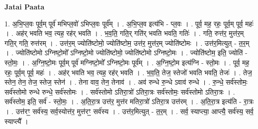 \documentclass[17pt]{extarticle}
\begin{document}
\textbf{Jatai Paata} \newline

1. अ॒भि॒प्ल॒वः पूर्व॒म् पूर्व॑ मभिप्ल॒वो॑ ऽभिप्ल॒वः पूर्व᳚म् । . अ॒भि॒प्ल॒व इत्य॑भि - प्ल॒वः । . पूर्व॒ मह॒ रहः॒ पूर्व॒म् पूर्व॒ महः॑ । . अह॑र् भवति भव॒ त्यह॒ रह॑र् भवति । . भ॒व॒ति॒ गति॒र् गति॑र् भवति भवति॒ गतिः॑ । . गति॒ रुत्त॑र॒ मुत्त॑र॒म् गति॒र् गति॒ रुत्त॑रम् । . उत्त॑र॒म् ज्योति॑ष्टोमो॒ ज्योति॑ष्टोम॒ उत्त॑र॒ मुत्त॑र॒म् ज्योति॑ष्टोमः । . उत्त॑र॒मित्युत् - त॒र॒म् । . ज्योति॑ष्टोमो ऽग्निष्टो॒मो᳚ ऽग्निष्टो॒मो ज्योति॑ष्टोमो॒ ज्योति॑ष्टोमो ऽग्निष्टो॒मः । . ज्योति॑ष्टोम॒ इति॒ ज्योति॑ - स्तो॒मः॒ । . अ॒ग्नि॒ष्टो॒मः पूर्व॒म् पूर्व॑ मग्निष्टो॒मो᳚ ऽग्निष्टो॒मः पूर्व᳚म् । . अ॒ग्नि॒ष्टो॒म इत्य॑ग्नि - स्तो॒मः । . पूर्व॒ मह॒ रहः॒ पूर्व॒म् पूर्व॒ महः॑ । . अह॑र् भवति भव॒ त्यह॒ रह॑र् भवति । . भ॒व॒ति॒ तेज॒ स्तेजो॑ भवति भवति॒ तेजः॑ । . तेज॒ स्तेन॒ तेन॒ तेज॒ स्तेज॒ स्तेन॑ । . तेना वाव॒ तेन॒ तेनाव॑ । . अव॑ रुन्धे रु॒न्धे ऽवाव॑ रुन्धे । . रु॒न्धे॒ सर्व॑स्तोमः॒ सर्व॑स्तोमो रुन्धे रुन्धे॒ सर्व॑स्तोमः । . सर्व॑स्तोमो ऽतिरा॒त्रो॑ ऽतिरा॒त्रः सर्व॑स्तोमः॒ सर्व॑स्तोमो ऽतिरा॒त्रः । . सर्व॑स्तोम॒ इति॒ सर्व॑ - स्तो॒मः॒ । . अ॒ति॒रा॒त्र उत्त॑र॒ मुत्त॑र मतिरा॒त्रो॑ ऽतिरा॒त्र उत्त॑रम् । . अ॒ति॒रा॒त्र इत्य॑ति - रा॒त्रः । . उत्त॑रꣳ॒॒ सर्व॑स्य॒ सर्व॒स्योत्त॑र॒ मुत्त॑रꣳ॒॒ सर्व॑स्य । . उत्त॑र॒मित्युत् - त॒र॒म् । . सर्व॒ स्याप्त्या॒ आप्त्यै॒ सर्व॑स्य॒ सर्व॒ स्याप्त्यै᳚ । \newline
\end{document}
